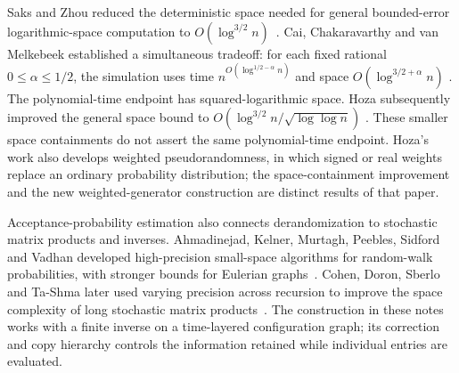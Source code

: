 \documentclass[11pt]{article}
\numberwithin{equation}{section}
\theoremstyle{definition}
\theoremstyle{remark}
\begin{document}
Saks and Zhou reduced the deterministic space needed for general
bounded-error logarithmic-space computation to
$O(\log^{3/2}n)$~\cite{SaksZhou1999}.
Cai, Chakaravarthy and van Melkebeek established a simultaneous
tradeoff: for each fixed rational $0\le\alpha\le1/2$, the simulation
uses time $n^{O(\log^{1/2-\alpha}n)}$ and space
$O(\log^{3/2+\alpha}n)$
\cite{CaiChakaravarthyVanMelkebeek2006}.
The polynomial-time endpoint has squared-logarithmic space.
Hoza subsequently improved the general space bound to
$O(\log^{3/2}n/\sqrt{\log\log n})$
\cite[Theorem~1.6 and Corollary~A.5]{Hoza2021}.
These smaller space containments do not assert the same polynomial-time
endpoint. Hoza's work also develops weighted pseudorandomness, in which
signed or real weights replace an ordinary probability distribution;
the space-containment improvement and the new weighted-generator
construction are distinct results of that paper.

Acceptance-probability estimation also connects derandomization to
stochastic matrix products and inverses. Ahmadinejad, Kelner, Murtagh,
Peebles, Sidford and Vadhan developed high-precision small-space
algorithms for random-walk probabilities, with stronger bounds for
Eulerian graphs~\cite{AhmadinejadKelnerMurtaghPeeblesSidfordVadhan2020}.
Cohen, Doron, Sberlo and Ta-Shma later used varying precision across
recursion to improve the space complexity of long stochastic matrix
products~\cite{CohenDoronSberloTaShma2023}. The construction in these notes works with a finite inverse on a time-layered configuration graph;
its correction and copy hierarchy controls the information retained
while individual entries are evaluated.
\end{document}
